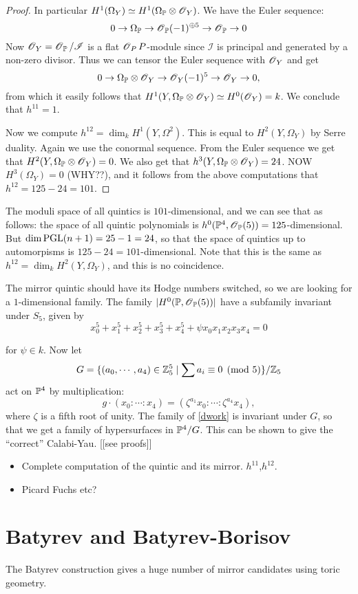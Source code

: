 \documentclass[11pt, english]{article}
\begin{document}
\begin{proof}
In particular $H^1(\Omega_Y) \simeq H^1(\Omega_{\mathbb{P}} \otimes \operatorname{\mathscr{O}}_Y)$. We have the Euler sequence:
$$
0 \to \Omega_{\mathbb{P}} \to \operatorname{\mathscr{O}}_{\mathbb{P}}(-1)^{\oplus 5} \to \operatorname{\mathscr{O}}_{\mathbb{P}} \to 0
$$
Now $\operatorname{\mathscr{O}}_Y=\operatorname{\mathscr{O}}_{\mathbb{P}}/\mathscr I$ is a flat $\operatorname{\mathscr{O}}_PP$-module since $\mathscr I$ is principal and generated by a non-zero divisor. Thus we can tensor the Euler sequence with $\operatorname{\mathscr{O}}_Y$ and get
$$
0 \to \Omega_{\mathbb{P}} \otimes \operatorname{\mathscr{O}}_Y \to \operatorname{\mathscr{O}}_Y(-1)^5 \to \operatorname{\mathscr{O}}_Y \to 0,
$$
from which it easily follows that $H^1(Y,\Omega_{\mathbb{P}} \otimes \operatorname{\mathscr{O}}_Y) \simeq H^0(\operatorname{\mathscr{O}}_Y) = k$. We conclude that $h^{11}=1$. 

Now we compute $h^{12} = \dim_k H^1(Y,\Omega^2)$. This is equal to $H^2(Y, \Omega_Y)$ by Serre duality. Again we use the conormal sequence. From the Euler sequence we get that $H^2(Y, \Omega_{\mathbb{P}} \otimes \operatorname{\mathscr{O}}_Y)=0$. We also get that $h^3(Y,\Omega_{\mathbb{P}} \otimes \operatorname{\mathscr{O}}_Y)=24$. NOW $H^3(\Omega_Y)=0$ (WHY??), and it follows from the above computations that $h^{12}=125-24=101$.
\end{proof}

The moduli space of all quintics is $101$-dimensional, and we can see that as follows: the space of all quintic polynomials is $h^0(\mathbb{P}^4,\operatorname{\mathscr{O}}_{\mathbb{P}}(5))=125$-dimensional. But $\dim \operatorname{PGL}(n+1)=25-1=24$, so that the space of quintics up to automorpisms is $125-24=101$-dimensional. Note that this is the same as $h^{12}=\dim_k H^2(Y,\Omega_Y)$, and this is no coincidence.

The mirror quintic should have its Hodge numbers switched, so we are looking for a $1$-dimensional family. The family $\lvert H^0(\mathbb{P},\operatorname{\mathscr{O}}_{\mathbb{P}}(5)) \rvert$ have a subfamily invariant under $S_5$, given by
\begin{equation}
\label{dwork}
x_0^5+x_1^5+x_2^5+x_3^5+x_4^5 + \psi x_0x_1x_2x_3x_4=0  
\end{equation}

for $\psi \in k$. Now let
$$
G = \{ (a_0,\cdots, a_4) \in \mathbb{Z}_5^5 \mid \sum a_i \equiv 0 \pmod 5 \} / \mathbb{Z}_5
$$
act on $\mathbb{P}^4$ by multiplication:
$$
g \cdot (x_0:\cdots:x_4) = (\zeta^{a_1}x_0:\cdots : \zeta^{a_4}x_4),
$$
where $\zeta$ is a fifth root of unity. The family of \eqref{dwork} is invariant under $G$, so that we get a family of hypersurfaces in $\mathbb{P}^4/G$. This can be shown to give the ``correct'' Calabi-Yau. [[see proofs]]

\begin{itemize}
\item Complete computation of the quintic and its mirror. $h^{11}$,$h^{12}$. 
\item Picard Fuchs etc?
\end{itemize}


\section{Batyrev and Batyrev-Borisov}

The Batyrev construction gives a huge number of mirror candidates using toric geometry. 
\end{document}
